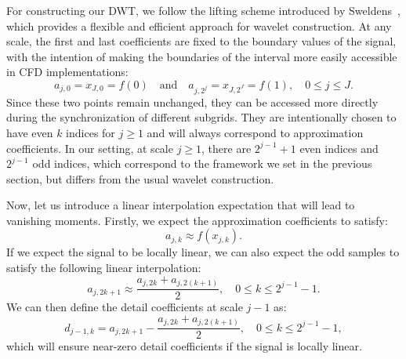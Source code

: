For constructing our DWT, we follow the lifting scheme introduced by Sweldens~\cite{sweldens1995lifting,sweldens2000building}, which provides a flexible and efficient approach for wavelet construction.
At any scale, the first and last coefficients are fixed to the boundary values of the signal, with the intention of making the boundaries of the interval more easily accessible in CFD implementations:
\begin{equation}
\label{eq:boundary_values_unchanged}
a_{j,0}=x_{J,0}=f(0) \quad \text{and} \quad a_{j,2^j}=x_{J,2^J}=f(1), \quad 0\leq j\leq J.
\end{equation}
Since these two points remain unchanged, they can be accessed more directly during the synchronization of different subgrids.
They are intentionally chosen to have even $k$ indices for \( j \geq 1 \) and will always correspond to approximation coefficients.
In our setting, at scale \( j \geq 1 \), there are \( 2^{j-1}+1 \) even indices and \( 2^{j-1} \) odd indices, which correspond to the framework we set in the previous section, but differs from the usual wavelet construction.

Now, let us introduce a linear interpolation expectation that will lead to vanishing moments.
Firstly, we expect the approximation coefficients to satisfy:
\begin{equation}
\label{eq:approximation_close_to_signal}
a_{j,k} \approx f(x_{j,k}).
\end{equation}
If we expect the signal to be locally linear, we can also expect the odd samples to satisfy the following linear interpolation:
\begin{equation}
\label{eq:odd_samples_linear_interpolation}
a_{j,2k+1} \approx \frac{a_{j,2k}+a_{j,2(k+1)}}{2}, \quad 0\leq k\leq2^{j-1}-1.
\end{equation}
We can then define the detail coefficients at scale \( j-1 \) as:
\begin{equation}
\label{eq:compute_details_general}
d_{j-1,k}=a_{j,2k+1}-\frac{a_{j,2k}+a_{j,2(k+1)}}{2}, \quad 0\leq k\leq2^{j-1}-1,
\end{equation}
which will ensure near-zero detail coefficients if the signal is locally linear.

